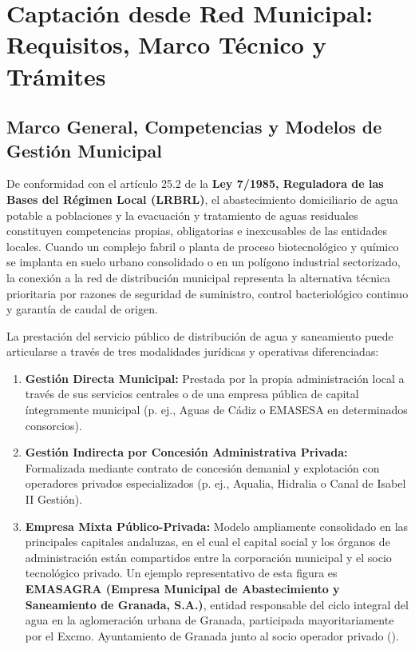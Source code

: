 \documentclass{report}
\begin{document}


\chapter{Captación desde Red Municipal: Requisitos, Marco Técnico y Trámites}
\label{cap:captacion_red_municipal}

\section{Marco General, Competencias y Modelos de Gestión Municipal}

De conformidad con el artículo 25.2 de la \textbf{Ley 7/1985, Reguladora de las Bases del Régimen Local (LRBRL)}, el abastecimiento domiciliario de agua potable a poblaciones y la evacuación y tratamiento de aguas residuales constituyen competencias propias, obligatorias e inexcusables de las entidades locales. Cuando un complejo fabril o planta de proceso biotecnológico y químico se implanta en suelo urbano consolidado o en un polígono industrial sectorizado, la conexión a la red de distribución municipal representa la alternativa técnica prioritaria por razones de seguridad de suministro, control bacteriológico continuo y garantía de caudal de origen.

La prestación del servicio público de distribución de agua y saneamiento puede articularse a través de tres modalidades jurídicas y operativas diferenciadas:
\begin{enumerate}
    \item \textbf{Gestión Directa Municipal:} Prestada por la propia administración local a través de sus servicios centrales o de una empresa pública de capital íntegramente municipal (p. ej., Aguas de Cádiz o EMASESA en determinados consorcios).
    \item \textbf{Gestión Indirecta por Concesión Administrativa Privada:} Formalizada mediante contrato de concesión demanial y explotación con operadores privados especializados (p. ej., Aqualia, Hidralia o Canal de Isabel II Gestión).
    \item \textbf{Empresa Mixta Público-Privada:} Modelo ampliamente consolidado en las principales capitales andaluzas, en el cual el capital social y los órganos de administración están compartidos entre la corporación municipal y el socio tecnológico privado. Un ejemplo representativo de esta figura es \textbf{EMASAGRA (Empresa Municipal de Abastecimiento y Saneamiento de Granada, S.A.)}, entidad responsable del ciclo integral del agua en la aglomeración urbana de Granada, participada mayoritariamente por el Excmo. Ayuntamiento de Granada junto al socio operador privado (\cite{EMASAGRA2026}).
\end{enumerate}
\end{document}

